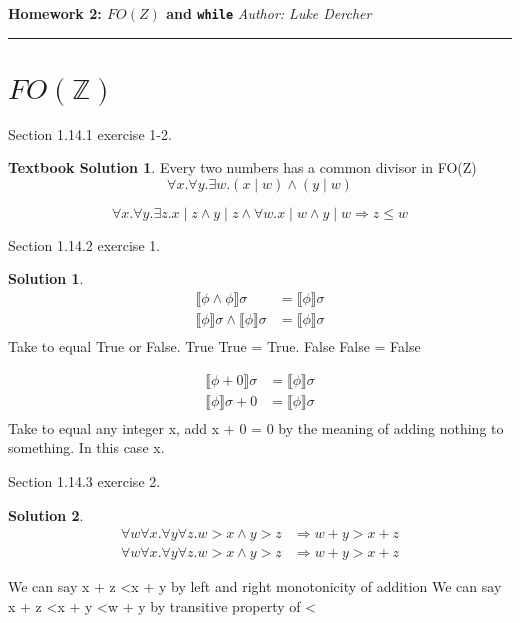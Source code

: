 \documentclass[10pt]{article}
\theoremstyle{definition}
\newtheorem{sol}{Solution}
\newtheorem{ts}{Textbook Solution}
\begin{document}
\noindent
\textbf{Homework 2: $FO(Z)$ and \texttt{while}} \hfill \emph{Author: Luke Dercher}
\hrule

\vspace{.3in}

\section*{$FO(\mathbb Z)$}

Section 1.14.1 exercise 1-2.

\begin{ts}
 Every two numbers has a common divisor in FO(Z)
 \begin{equation}
 	\forall x. \forall y. \exists w. ( x \mid w) \wedge (y \mid w)
 \end{equation}
 
 \begin{equation}
 	\forall x. \forall y. \exists z. x \mid z \wedge y \mid z \wedge \forall w. x \mid w \wedge y \mid w \Rightarrow z \leq w
 \end{equation}
\end{ts}

Section 1.14.2 exercise 1.

\begin{sol}

\begin{align*}
	\llbracket \phi \wedge \phi \rrbracket \sigma &=  \llbracket \phi \rrbracket \sigma \\ \llbracket \phi \rrbracket \sigma \wedge \llbracket \phi \rrbracket \sigma &=  \llbracket \phi \rrbracket \sigma \\
\end{align*}
 Take \textphi to equal True or False. True \textturnv  True = True. False \textturnv  False = False
 
 \begin{align*}
	\llbracket \phi + 0 \rrbracket \sigma &=  \llbracket \phi \rrbracket \sigma \\ \llbracket \phi \rrbracket \sigma + 0 &=  \llbracket \phi \rrbracket \sigma \\
\end{align*}
Take \textphi to equal any integer x, add x + 0 = 0 by the meaning of adding nothing to something. In this case x. 

\end{sol}

Section 1.14.3 exercise 2.

\begin{sol}

\begin{align*}
\forall w \forall x. \forall y \forall z. w > x \wedge y > z &\Rightarrow w + y > x + z \\ \forall w \forall x. \forall y \forall z. w > x \wedge y > z &\Rightarrow w + y > x + z
\end{align*}

We can say x + z \textless x + y by left and right monotonicity of addition
We can say x + z \textless x + y \textless w + y by transitive property of \textless
\end{sol}
\end{document}
